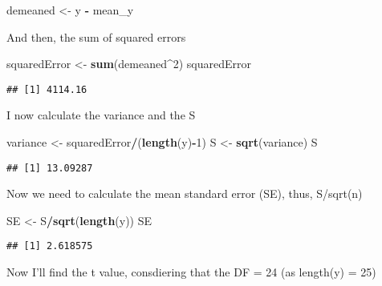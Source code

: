 \documentclass[
]{article}
\newenvironment{Shaded}{\begin{snugshade}}{\end{snugshade}}
\newcommand{\DecValTok}[1]{\textcolor[rgb]{0.00,0.00,0.81}{#1}}
\newcommand{\FunctionTok}[1]{\textcolor[rgb]{0.13,0.29,0.53}{\textbf{#1}}}
\newcommand{\NormalTok}[1]{#1}
\newcommand{\OtherTok}[1]{\textcolor[rgb]{0.56,0.35,0.01}{#1}}
\newcommand{\SpecialCharTok}[1]{\textcolor[rgb]{0.81,0.36,0.00}{\textbf{#1}}}
\begin{document}
\begin{Shaded}
\begin{Highlighting}[]
\NormalTok{demeaned }\OtherTok{\textless{}{-}}\NormalTok{ y }\SpecialCharTok{{-}}\NormalTok{ mean\_y}
\end{Highlighting}
\end{Shaded}

And then, the sum of squared errors

\begin{Shaded}
\begin{Highlighting}[]
\NormalTok{squaredError }\OtherTok{\textless{}{-}} \FunctionTok{sum}\NormalTok{(demeaned}\SpecialCharTok{\^{}}\DecValTok{2}\NormalTok{)}
\NormalTok{squaredError}
\end{Highlighting}
\end{Shaded}

\begin{verbatim}
## [1] 4114.16
\end{verbatim}

I now calculate the variance and the S

\begin{Shaded}
\begin{Highlighting}[]
\NormalTok{variance }\OtherTok{\textless{}{-}}\NormalTok{ squaredError}\SpecialCharTok{/}\NormalTok{(}\FunctionTok{length}\NormalTok{(y)}\SpecialCharTok{{-}}\DecValTok{1}\NormalTok{)}
\NormalTok{S }\OtherTok{\textless{}{-}} \FunctionTok{sqrt}\NormalTok{(variance)}
\NormalTok{S}
\end{Highlighting}
\end{Shaded}

\begin{verbatim}
## [1] 13.09287
\end{verbatim}

Now we need to calculate the mean standard error (SE), thus, S/sqrt(n)

\begin{Shaded}
\begin{Highlighting}[]
\NormalTok{SE }\OtherTok{\textless{}{-}}\NormalTok{ S}\SpecialCharTok{/}\FunctionTok{sqrt}\NormalTok{(}\FunctionTok{length}\NormalTok{(y))}
\NormalTok{SE}
\end{Highlighting}
\end{Shaded}

\begin{verbatim}
## [1] 2.618575
\end{verbatim}

Now I'll find the t value, consdiering that the DF = 24 (as length(y) =
25)
\end{document}
